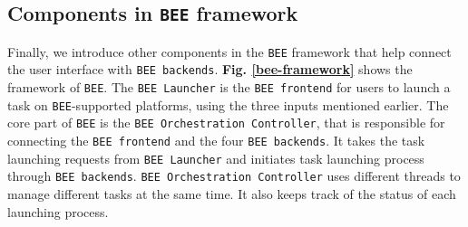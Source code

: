 \subsection{Components in \texttt{BEE} framework}
Finally, we introduce other components in the \texttt{BEE} framework that help connect the user interface with  \texttt{BEE backends}. \textbf{Fig. \ref{bee-framework}} shows the framework of \texttt{BEE}. The \texttt{BEE Launcher} is the \texttt{BEE frontend} for users to launch a task on \texttt{BEE}-supported platforms, using the three inputs mentioned earlier. The core part of \texttt{BEE} is the \texttt{BEE Orchestration Controller}, that is responsible for connecting the \texttt{BEE frontend} and the four \texttt{BEE backends}. It takes the task launching requests from \texttt{BEE Launcher} and initiates task launching process through \texttt{BEE backends}. \texttt{BEE Orchestration Controller} uses different threads to manage different tasks at the same time. It also keeps track of the status of each launching process.









